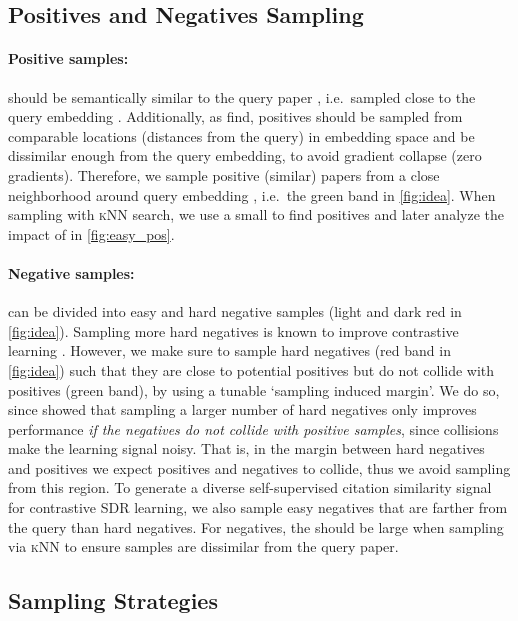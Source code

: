 \documentclass[11pt]{article}
\newcommand{\knn}{\textsc{kNN}\xspace}
\newcommand*\negIcon{\scalebox{0.15}{
\begin{tikzpicture}[]
    \draw[line width=0.5cm,white] (0,-.5cm) -- (0, .5cm);
    \draw[line width=0.75cm,black] (-1.1cm,0) -- (1.1cm,0); \draw[line width=0.5cm,easyNegColor] (-1cm,0) -- (1cm,0);
\end{tikzpicture}}\xspace}
\newcommand*\negIconHard{\scalebox{0.15}{
\begin{tikzpicture}[]
    \draw[line width=0.5cm,white] (0,-.5cm) -- (0, .5cm);
    \draw[line width=0.75cm,black] (-1.1cm,0) -- (1.1cm,0); \draw[line width=0.5cm,hardNegColor] (-1cm,0) -- (1cm,0);
\end{tikzpicture}}\xspace}
\begin{document}
\subsection{Positives and Negatives Sampling}\label{ssec:neg_pos_sampling}
\paragraph{Positive samples:}  should be semantically similar to the query paper , i.e.\ sampled close to the query embedding . Additionally, as \citet{PositivesSimilarImportant} find, positives should be sampled from comparable locations (distances from the query) in embedding space and be dissimilar enough from the query embedding, to avoid gradient collapse (zero gradients). 
Therefore, we sample  positive (similar) papers from a close neighborhood around query embedding  ,
i.e.\ the green band in \cref{fig:idea}. When sampling with \knn search, we use a small  to find positives and later analyze the impact of  in \cref{fig:easy_pos}.

\paragraph{Negative samples:}
can be divided into easy \negIcon and hard \negIconHard negative samples (light and dark red in \cref{fig:idea}). Sampling more hard negatives is known to improve contrastive learning \cite{Bucher2016,Wu2017}.
However, we make sure to sample hard negatives (red band in \cref{fig:idea}) such that they are close to potential positives but do not collide with positives (green band), by using a tunable `sampling induced margin'.
We do so, since \citet{ContrastiveLearningLimitations} showed that sampling a larger number of hard negatives only improves performance \emph{if the negatives do not collide with positive samples}, since collisions make the learning signal noisy.
That is, in the margin between hard negatives and positives we expect positives and negatives to collide, thus we avoid sampling from this region. To generate a diverse self-supervised citation similarity signal for contrastive SDR learning, we also sample easy negatives that are farther from the query than hard negatives.
For negatives, the  should be large when sampling via \knn
to ensure samples are dissimilar from the query paper.

\subsection{Sampling Strategies} \label{sssec:sampling-strategies} \label{ssec:triplet-minig}
\end{document}
